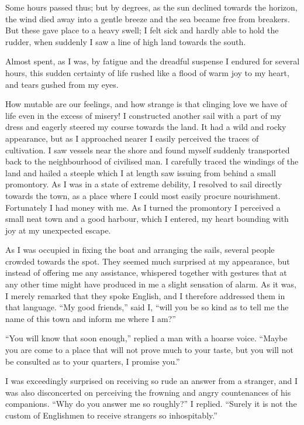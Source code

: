 \documentclass[12pt,openright]{book}
\begin{document}
Some hours passed thus; but by degrees, as the sun declined towards the horizon, the wind died away into a gentle breeze and the sea became free from breakers. But these gave place to a heavy swell; I felt sick and hardly able to hold the rudder, when suddenly I saw a line of high land towards the south.

Almost spent, as I was, by fatigue and the dreadful suspense I endured for several hours, this sudden certainty of life rushed like a flood of warm joy to my heart, and tears gushed from my eyes.

How mutable are our feelings, and how strange is that clinging love we have of life even in the excess of misery! I constructed another sail with a part of my dress and eagerly steered my course towards the land. It had a wild and rocky appearance, but as I approached nearer I easily perceived the traces of cultivation. I saw vessels near the shore and found myself suddenly transported back to the neighbourhood of civilised man. I carefully traced the windings of the land and hailed a steeple which I at length saw issuing from behind a small promontory. As I was in a state of extreme debility, I resolved to sail directly towards the town, as a place where I could most easily procure nourishment. Fortunately I had money with me. As I turned the promontory I perceived a small neat town and a good harbour, which I entered, my heart bounding with joy at my unexpected escape.

As I was occupied in fixing the boat and arranging the sails, several people crowded towards the spot. They seemed much surprised at my appearance, but instead of offering me any assistance, whispered together with gestures that at any other time might have produced in me a slight sensation of alarm. As it was, I merely remarked that they spoke English, and I therefore addressed them in that language. “My good friends,” said I, “will you be so kind as to tell me the name of this town and inform me where I am?”

“You will know that soon enough,” replied a man with a hoarse voice. “Maybe you are come to a place that will not prove much to your taste, but you will not be consulted as to your quarters, I promise you.”

I was exceedingly surprised on receiving so rude an answer from a stranger, and I was also disconcerted on perceiving the frowning and angry countenances of his companions. “Why do you answer me so roughly?” I replied. “Surely it is not the custom of Englishmen to receive strangers so inhospitably.”
\end{document}
